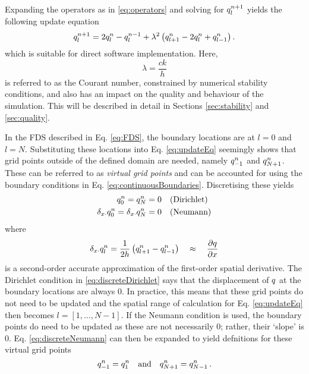 Expanding the operators as in %
\eqref{eq:operators} and solving for $q_l^{n+1}$ yields the following update equation
\begin{equation}\label{eq:updateEq}
    q_l^{n+1} = 2q_l^n-q_l^{n-1} + \lambda^2 \left(q_{l+1}^n-2q_l^n + q_{l-1}^n\right).
\end{equation}
which is suitable for direct software implementation. %
Here,
\begin{equation}\label{eq:lambdaDef}
    \lambda = \frac{ck}{h}
\end{equation}
is referred to as the Courant number, constrained by numerical stability conditions, and also has an impact on the quality and behaviour of the simulation. This will be described in detail in Sections \ref{sec:stability} and \ref{sec:quality}.

In the FDS described in Eq. \eqref{eq:FDS}, the boundary locations are at $l = 0$ and $l = N$. Substituting these locations into Eq. \eqref{eq:updateEq} seemingly shows that grid points outside of the defined domain are needed, namely $q_{-1}^n$ and $q_{N+1}^n$. These can be referred to as \textit{virtual grid points} and can be accounted for using the boundary conditions in Eq. \eqref{eq:continuousBoundaries}. Discretising these yields
\begin{subequations}
    \begin{align}
        q_0^n = q_N^n &= 0 \quad\text{(Dirichlet)}\label{eq:discreteDirichlet}\\
        \delta_{x\cdot} q_0^n = \delta_{x\cdot} q_N^n &= 0 \quad \text{(Neumann)}\label{eq:discreteNeumann}
    \end{align}
\end{subequations}
where 
\begin{equation}
    \delta_{x\cdot}q_l^n = \frac{1}{2h}\left(q_{l+1}^n - q_{l-1}^n\right)\quad \approx\quad \frac{\partial q}{\partial x}
\end{equation}
is a second-order accurate approximation of the first-order spatial derivative. The Dirichlet condition in \eqref{eq:discreteDirichlet} says that the displacement of $q$ at the boundary locations are always 0. In practice, this means that these grid points do not need to be updated and the spatial range of calculation for Eq. \eqref{eq:updateEq} then becomes $l = [1, \hdots, N-1]$. If the Neumann condition is used, the boundary points do need to be updated as these are not necessarily $0$; rather, their `slope' is $0$. Eq. \eqref{eq:discreteNeumann} can then be expanded to yield defnitions for these virtual grid points
\begin{equation}\label{eq:neumannSolution}
    q_{-1}^n = q_1^n \quad \text{and} \quad q_{N+1}^n = q_{N-1}^n\,.
\end{equation}

